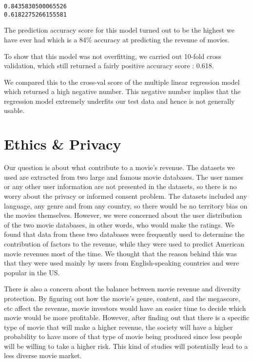 \documentclass[11pt]{article}
\begin{document}
    \begin{Verbatim}[commandchars=\\\{\}]
0.8435830500065526
0.6182275266155581

    \end{Verbatim}

    The prediction accuracy score for this model turned out to be the
highest we have ever had which is a 84\% accuracy at predicting the
revenue of movies.

To show that this model was not overfitting, we carried out 10-fold
cross validation, which still returned a fairly positive accuracy score
: 0.618.

We compared this to the cross-val score of the multiple linear
regression model which returned a high negative number. This negative
number implies that the regression model extremely underfits our test
data and hence is not generally usable.

    \section{Ethics \& Privacy}\label{ethics-privacy}

    Our question is about what contribute to a movie's revenue. The datasets
we used are extracted from two large and famous movie databases. The
user names or any other user information are not presented in the
datasets, so there is no worry about the privacy or informed consent
problem. The datasets included any language, any genre and from any
country, so there would be no territory bias on the movies themselves.
However, we were concerned about the user distribution of the two movie
databases, in other words, who would make the ratings. We found that
data from these two databases were frequently used to determine the
contribution of factors to the revenue, while they were used to predict
American movie revenues most of the time. We thought that the reason
behind this was that they were used mainly by users from
English-speaking countries and were popular in the US.

There is also a concern about the balance between movie revenue and
diversity protection. By figuring out how the movie's genre, content,
and the megascore, etc affect the revenue, movie investors would have an
easier time to decide which movie would be more profitable. However,
after finding out that there is a specific type of movie that will make
a higher revenue, the society will have a higher probability to have
more of that type of movie being produced since less people will be
willing to take a higher risk. This kind of studies will potentially
lead to a less diverse movie market.
\end{document}
